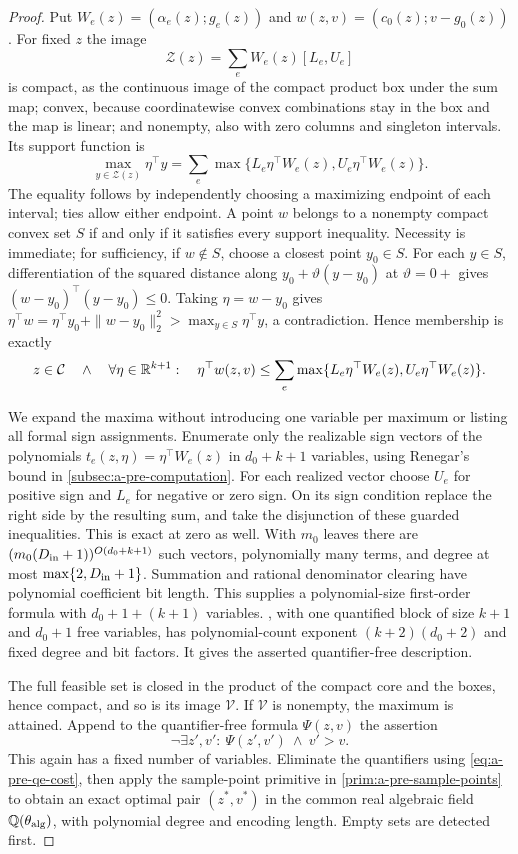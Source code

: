 \begin{proof}
Put $W_e(z)=(\alpha_e(z);g_e(z))$ and
$w(z,v)=(c_0(z);v-g_0(z))$. For fixed $z$ the image
\[
 \mathcal Z(z)=\sum_e W_e(z)[L_e,U_e]
\]
is compact, as the continuous image of the compact product box under
the sum map; convex, because coordinatewise convex combinations stay in
the box and the map is linear; and nonempty, also with zero columns and
singleton intervals. Its support function is
\[
 \max_{y\in\mathcal Z(z)}\eta^\top y
   =\sum_e\max\{L_e\eta^\top W_e(z),U_e\eta^\top W_e(z)\}.
\]
The equality follows by independently choosing a maximizing endpoint
of each interval; ties allow either endpoint.
A point $w$ belongs to a nonempty compact convex set $S$ if and only
if it satisfies every support inequality. Necessity is immediate;
for sufficiency, if $w\notin S$, choose a closest point $y_0\in S$.
For each $y\in S$, differentiation of the squared distance along
$y_0+\vartheta(y-y_0)$ at $\vartheta=0+$ gives
$(w-y_0)^\top(y-y_0)\le0$. Taking $\eta=w-y_0$ gives
$\eta^\top w=\eta^\top y_0+\|w-y_0\|_2^2>
\max_{y\in S}\eta^\top y$, a contradiction. Hence membership is exactly
\begin{equation}
 z\in\mathcal C\quad\wedge\quad
 \forall\eta\in\mathbb{R}^{k+1}:\quad
 \eta^\top w(z,v)\le
 \sum_e\max\{L_e\eta^\top W_e(z),U_e\eta^\top W_e(z)\}.
 \label{eq:a-blk-support}
\end{equation}

We expand the maxima without introducing one variable per maximum or
listing all formal sign assignments. Enumerate only the
realizable sign vectors of the polynomials
$t_e(z,\eta)=\eta^\top W_e(z)$ in $d_0+k+1$ variables, using Renegar's
bound in \cref{subsec:a-pre-computation}. For each realized vector
choose $U_e$ for positive sign and $L_e$ for negative or zero sign.
On its sign condition replace the right side by the resulting sum,
and take the disjunction of these guarded inequalities. This is
exact at zero as well. With $m_0$ leaves there are
$(m_0(D_{\rm in}+1))^{O(d_0+k+1)}$ such vectors, polynomially many terms,
and degree at most $\max\{2,D_{\rm in}+1\}$. Summation and rational denominator clearing
have polynomial coefficient bit length. This supplies a polynomial-size
first-order formula with $d_0+1+(k+1)$ variables.
, with one quantified block of size $k+1$ and
$d_0+1$ free variables, has polynomial-count exponent
$(k+2)(d_0+2)$ and fixed degree and bit factors. It gives the asserted
quantifier-free description.

The full feasible set is closed in the product of the compact core
and the boxes, hence compact, and so is its image $\mathcal V$.
If $\mathcal V$ is nonempty, the maximum is attained. Append to the quantifier-free
formula $\Psi(z,v)$ the assertion
\[
 \neg\exists z',v':\ \Psi(z',v')\ \wedge\ v'>v.
\]
This again has a fixed number of variables. Eliminate the quantifiers
using \cref{eq:a-pre-qe-cost}, then apply the sample-point primitive
in \cref{prim:a-pre-sample-points}
to obtain an exact optimal pair $(z^*,v^*)$ in the common real algebraic
field $\mathbb{Q}(\theta_{\rm alg})$, with polynomial degree and encoding length.
Empty sets are detected first.


\end{proof}
